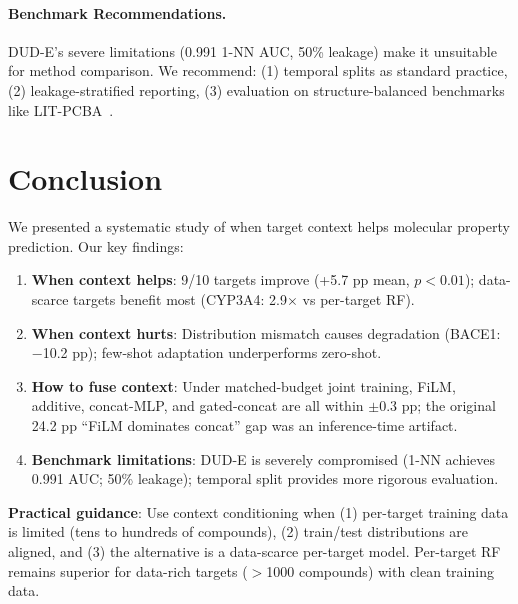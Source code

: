\documentclass[sigconf]{acmart}
\begin{document}
\paragraph{Benchmark Recommendations.}
DUD-E's severe limitations (0.991 1-NN AUC, 50\% leakage) make it unsuitable for method comparison. We recommend: (1) temporal splits as standard practice, (2) leakage-stratified reporting, (3) evaluation on structure-balanced benchmarks like LIT-PCBA~\cite{tran_2020_litpcba}.

\section{Conclusion}
\label{sec:conclusion}

We presented a systematic study of when target context helps molecular property prediction. Our key findings:

\begin{enumerate}[noitemsep,topsep=2pt]
\item \textbf{When context helps}: 9/10 targets improve (+5.7 pp mean, $p < 0.01$); data-scarce targets benefit most (CYP3A4: 2.9$\times$ vs per-target RF).
\item \textbf{When context hurts}: Distribution mismatch causes degradation (BACE1: $-$10.2 pp); few-shot adaptation underperforms zero-shot.
\item \textbf{How to fuse context}: Under matched-budget joint training, FiLM, additive, concat-MLP, and gated-concat are all within $\pm 0.3$ pp; the original 24.2 pp ``FiLM dominates concat'' gap was an inference-time artifact.
\item \textbf{Benchmark limitations}: DUD-E is severely compromised (1-NN achieves 0.991 AUC; 50\% leakage); temporal split provides more rigorous evaluation.
\end{enumerate}

\textbf{Practical guidance}: Use context conditioning when (1) per-target training data is limited (tens to hundreds of compounds), (2) train/test distributions are aligned, and (3) the alternative is a data-scarce per-target model. Per-target RF remains superior for data-rich targets ($>$1000 compounds) with clean training data.
\end{document}
